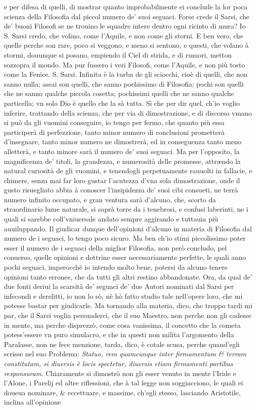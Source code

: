 \documentclass[11pt,twoside,openany]{book}
\begin{document}
e per difesa di quelli, di mostrar quanto improbabilmente ei conclude la lor poca scienza della Filosofia dal piccol numero de' suoi seguaci. Forse crede il Sarsi, che de' buoni Filosofi se ne trouino le squadre intere dentro ogni ricinto di mura? Io S. Sarsi credo, che volino, come l'Aquile, e non come gli storni. E ben vero, che quelle perche son rare, poco si veggono, e meno si sentono, e questi, che volano à stormi, douunque si posano, empiendo il Ciel di strida, e di rumori, metton sozzopra il mondo. Ma pur fussero i veri Filosofi, come l'Aquile, e non più tosto come la Fenice. S. Sarsi. Infinita è la turba de gli sciocchi, cioè di quelli, che non sanno nulla; assai son quelli, che sanno pochissimo di Filosofia; pochi son quelli che ne sanno qualche piccola cosetta; pochissimi quelli che ne sanno qualche particella; vn solo Dio è quello che la sà tutta. Sì che per dir quel, ch'io voglio inferire, trattando della scienza, che per via di dimostrazione, e di discorso vmano si può da gli vuomini conseguire, io tengo per fermo, che quanto più essa participerà di perfezzione, tanto minor numero di conclusioni prometterà d'insegnare, tanto minor numero ne dimostrerà, ed in conseguenza tanto meno alletterà, e tanto minore sarà il numero de' suoi seguaci. Ma per l'opposito, la magnificenza de' titoli, la grandezza, e numerosità delle promesse, attrændo la natural curiosità de gli vuomini, e tenendogli perpetuamente rauuolti in fallacie, e chimere, senza mai far loro gustar l'acutezza d'vna sola dimostrazione, onde il gusto risuegliato abbia à conoscer l'insipidezza de' suoi cibi consueti, ne terrà numero infinito occupato, e gran ventura sarà d'alcuno, che, scorto da straordinario lume naturale, si saprà torre da i tenebrosi, e confusi laberinti, ne i quali si sarebbe coll'vniuersale andato sempre aggirando e tuttauia più auuiluppando. Il giudicar dunque dell'opinioni d'alcuno in materia di Filosofia dal numero de i seguaci, lo tengo poco sicuro. Ma ben ch'io stimi piccolissimo poter esser il numero de i seguaci della miglior Filosofia, non però concludo, pel conuerso, quelle opinioni e dottrine esser necessariamente perfette, le quali anno pochi seguaci, imperocchè io intendo molto bene, potersi da alcuno tenere opinioni tanto erronee, che da tutti gli altri restino abbandonate. Ora, da qual de' due fonti deriui la scarsità de' seguaci de' due Autori nominati dal Sarsi per infecondi e derelitti, io non lo sò, nè hò fatto studio tale nell'opere loro, che mi potesse bastar per giudicarle. Ma tornando alla materia, dico, che troppo tardi mi par, che il Sarsi voglia persuaderci, che il suo Maestro, non perche non gli cadesse in mente, ma perche disprezzò, come cosa vanissima, il concetto che la cometa potess'essere vn puro simulacro, e che in questi non milita l'argomento della Paralasse, non ne fece menzione, tarda, dico, è cotale scusa, perche quand'egli scrisse nel suo Problema: \textit{Statuo, rem quamcunque inter firmamentum \& terram constitutam, si diuersis è locis spectetur, diuersis etiam firmamenti partibus responsuram}. Chiaramente si dimostrò non gli esser venuto in mente l'Iride e l'Alone, i Parelij ed altre riflessioni, che à tal legge non soggiacciono, le quali ei doueua nominare, \& eccettuare, e massime, ch'egli stesso, lasciando Aristotile, inclina all'opinione 
\end{document}

